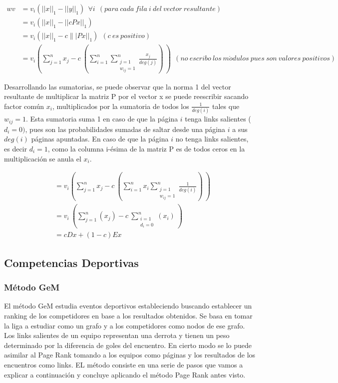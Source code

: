 \begin{align*}
wv &= v_i ( ||x||_1 - ||y||_1) \ \ \forall{i} \ \ (para\  cada\ fila\ i\ del\ vector\ resultante) \\
&= v_i ( ||x||_1 - ||cPx||_1) \\
&= v_i ( ||x||_1 - c \||Px||_1) \ \ (c\ es\ positivo) \\ 
&= v_i ( \sum_{j=1}^n x_j - c\ (\sum_{i=1}^n \sum_{\substack{j = 1 \\ w_{ij} = 1}}^n \frac{x_j}{deg(j)})\ )\ \ (no\ escribo\ los\ m\acute{o}dulos\ pues\ son\ valores\ positivos) 
\end{align*}

\par Desarrollando las sumatorias, se puede observar que la norma 1 del vector resultante de multiplicar la matriz P por el vector x se puede reescribir sacando factor común $x_i$, multiplicados por la sumatoria de todos los $\frac{1}{deg(i)}$ tales que $w_{ij} = 1$. Esta sumatoria suma 1 en caso de que la página $i$ tenga links salientes ($d_i = 0)$, pues son las probabilidades sumadas de saltar desde una página $i$ a sus $deg(i)$ páginas apuntadas. En caso de que la página $i$ no tenga links salientes, es decir $d_i = 1$, como la columna i-ésima de la matriz P es de todos ceros en la multiplicación se anula el $x_i$.

\begin{align*}
&= v_i ( \sum_{j=1}^n x_j - c\ (\sum_{i=1}^n x_i \sum_{\substack{j = 1 \\ w_{ij} = 1}}^n \frac{1}{deg(i)})\ )\\
& = v_i \ ( \sum_{j=1}^n (x_j) - c\ \sum_{\substack{i = 1 \\ d_i = 0}}^n (x_i)\ )  \\
& = cDx + (1-c)Ex
\end{align*}

\subsection{Competencias Deportivas}

\subsubsection{M\'etodo GeM}
\par El m\'etodo GeM estudia eventos deportivos estableciendo buscando establecer un ranking de los competidores en base a los resultados obtenidos. Se basa en tomar la liga a estudiar como un grafo y a los competidores como nodos de ese grafo. Los links salientes de un equipo representan una derrota y tienen un peso determinado por la diferencia de goles del encuentro. En cierto modo se lo puede asimilar al Page Rank tomando a los equipos como p\'aginas y los resultados de los encuentros como links. EL m\'etodo consiste en una serie de pasos que vamos a explicar a continuaci\'on y concluye aplicando el m\'etodo Page Rank antes visto.


